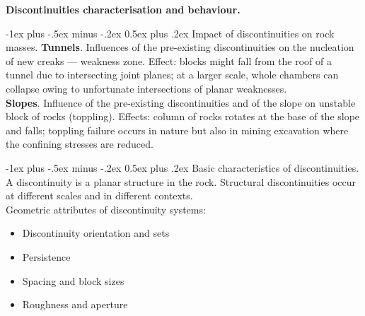 \documentclass[10pt,landscape,a4paper]{article}
\makeatletter
\newcounter{Chapcounter}
\newcommand{\chapter}[1]{{\addtocounter{Chapcounter}{1}\fontsize{17}{16}\textbf{#1}}}
\renewcommand{\section}{\@startsection{section}{1}{0mm}%
	{-1ex plus -.5ex minus -.2ex}%
	{0.5ex plus .2ex}%
	{\normalfont\large\bfseries}}
\makeatother
\begin{document}
\begin{multicols}{3}
		\chapter{Discontinuities characterisation and behaviour.}
		
		\section{Impact of discontinuities on rock masses.}
		\textbf{Tunnels}.
		Influences of the pre-existing discontinuities on the nucleation of new creaks --- weakness zone.
		Effect: blocks might fall from the roof of a tunnel due to intersecting joint planes; at a larger scale, whole chambers can collapse owing to unfortunate intersections of planar weaknesses.\\
		\textbf{Slopes}.
		Influence of the pre-existing discontinuities and of the slope on unstable block of rocks (toppling).
		Effects: column of rocks rotates at the base of the slope and falls; toppling failure occurs in nature but also in mining excavation where the confining stresses are reduced.
		
		\section{Basic characteristics of discontinuities.}
		A discontinuity is a planar structure in the rock.
		Structural discontinuities occur at different scales and in different contexts.\\
		Geometric attributes of discontinuity systems:
		\begin{itemize}
			\item Discontinuity orientation and sets
			\item Persistence
			\item Spacing and block sizes
			\item Roughness and aperture
		\end{itemize}
		

\end{multicols}
\end{document}
